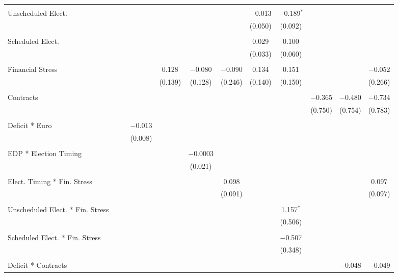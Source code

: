 \begin{table}[!htbp]
\begin{tabular}{@{\extracolsep{5pt}}lccccccccccc}
  & & & & & & & & & & & \\ 
 Unscheduled Elect. &  &  &  &  &  &  & $-$0.013 & $-$0.189$^{*}$ &  &  &  \\ 
  &  &  &  &  &  &  & (0.050) & (0.092) &  &  &  \\ 
  & & & & & & & & & & & \\ 
 Scheduled Elect. &  &  &  &  &  &  & 0.029 & 0.100 &  &  &  \\ 
  &  &  &  &  &  &  & (0.033) & (0.060) &  &  &  \\ 
  & & & & & & & & & & & \\ 
 Financial Stress &  &  &  & 0.128 & $-$0.080 & $-$0.090 & 0.134 & 0.151 &  &  & $-$0.052 \\ 
  &  &  &  & (0.139) & (0.128) & (0.246) & (0.140) & (0.150) &  &  & (0.266) \\ 
  & & & & & & & & & & & \\ 
 Contracts &  &  &  &  &  &  &  &  & $-$0.365 & $-$0.480 & $-$0.734 \\ 
  &  &  &  &  &  &  &  &  & (0.750) & (0.754) & (0.783) \\ 
  & & & & & & & & & & & \\ 
 Deficit * Euro &  &  & $-$0.013 &  &  &  &  &  &  &  &  \\ 
  &  &  & (0.008) &  &  &  &  &  &  &  &  \\ 
  & & & & & & & & & & & \\ 
 EDP * Election Timing &  &  &  &  & $-$0.0003 &  &  &  &  &  &  \\ 
  &  &  &  &  & (0.021) &  &  &  &  &  &  \\ 
  & & & & & & & & & & & \\ 
 Elect. Timing * Fin. Stress &  &  &  &  &  & 0.098 &  &  &  &  & 0.097 \\ 
  &  &  &  &  &  & (0.091) &  &  &  &  & (0.097) \\ 
  & & & & & & & & & & & \\ 
 Unscheduled Elect. * Fin. Stress &  &  &  &  &  &  &  & 1.157$^{*}$ &  &  &  \\ 
  &  &  &  &  &  &  &  & (0.506) &  &  &  \\ 
  & & & & & & & & & & & \\ 
 Scheduled Elect. * Fin. Stress &  &  &  &  &  &  &  & $-$0.507 &  &  &  \\ 
  &  &  &  &  &  &  &  & (0.348) &  &  &  \\ 
  & & & & & & & & & & & \\ 
 Deficit * Contracts &  &  &  &  &  &  &  &  &  & $-$0.048 & $-$0.049 \\ 

\end{tabular}
\end{table}
